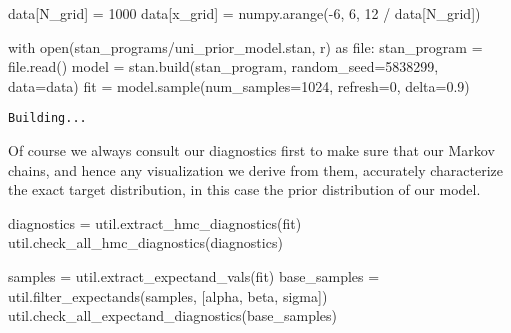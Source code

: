 \documentclass[
  letterpaper,
  DIV=11,
  numbers=noendperiod]{scrartcl}
\newenvironment{Shaded}{\begin{snugshade}}{\end{snugshade}}
\newcommand{\BuiltInTok}[1]{\textcolor[rgb]{0.00,0.23,0.31}{#1}}
\newcommand{\ControlFlowTok}[1]{\textcolor[rgb]{0.00,0.23,0.31}{#1}}
\newcommand{\DecValTok}[1]{\textcolor[rgb]{0.68,0.00,0.00}{#1}}
\newcommand{\FloatTok}[1]{\textcolor[rgb]{0.68,0.00,0.00}{#1}}
\newcommand{\ImportTok}[1]{\textcolor[rgb]{0.00,0.46,0.62}{#1}}
\newcommand{\NormalTok}[1]{\textcolor[rgb]{0.00,0.23,0.31}{#1}}
\newcommand{\OperatorTok}[1]{\textcolor[rgb]{0.37,0.37,0.37}{#1}}
\newcommand{\StringTok}[1]{\textcolor[rgb]{0.13,0.47,0.30}{#1}}
\begin{document}
\begin{Shaded}
\begin{Highlighting}[]
\NormalTok{data[}\StringTok{\textquotesingle{}N\_grid\textquotesingle{}}\NormalTok{] }\OperatorTok{=} \DecValTok{1000}
\NormalTok{data[}\StringTok{\textquotesingle{}x\_grid\textquotesingle{}}\NormalTok{] }\OperatorTok{=}\NormalTok{ numpy.arange(}\OperatorTok{{-}}\DecValTok{6}\NormalTok{, }\DecValTok{6}\NormalTok{, }\DecValTok{12} \OperatorTok{/}\NormalTok{ data[}\StringTok{\textquotesingle{}N\_grid\textquotesingle{}}\NormalTok{])}

\ControlFlowTok{with} \BuiltInTok{open}\NormalTok{(}\StringTok{\textquotesingle{}stan\_programs/uni\_prior\_model.stan\textquotesingle{}}\NormalTok{, }\StringTok{\textquotesingle{}r\textquotesingle{}}\NormalTok{) }\ImportTok{as} \BuiltInTok{file}\NormalTok{:}
\NormalTok{  stan\_program }\OperatorTok{=} \BuiltInTok{file}\NormalTok{.read()}
\NormalTok{model }\OperatorTok{=}\NormalTok{ stan.build(stan\_program, random\_seed}\OperatorTok{=}\DecValTok{5838299}\NormalTok{, data}\OperatorTok{=}\NormalTok{data)}
\NormalTok{fit }\OperatorTok{=}\NormalTok{ model.sample(num\_samples}\OperatorTok{=}\DecValTok{1024}\NormalTok{, refresh}\OperatorTok{=}\DecValTok{0}\NormalTok{, delta}\OperatorTok{=}\FloatTok{0.9}\NormalTok{)}
\end{Highlighting}
\end{Shaded}

\begin{verbatim}
Building...
\end{verbatim}

Of course we always consult our diagnostics first to make sure that our
Markov chains, and hence any visualization we derive from them,
accurately characterize the exact target distribution, in this case the
prior distribution of our model.

\begin{Shaded}
\begin{Highlighting}[]
\NormalTok{diagnostics }\OperatorTok{=}\NormalTok{ util.extract\_hmc\_diagnostics(fit)}
\NormalTok{util.check\_all\_hmc\_diagnostics(diagnostics)}

\NormalTok{samples }\OperatorTok{=}\NormalTok{ util.extract\_expectand\_vals(fit)}
\NormalTok{base\_samples }\OperatorTok{=}\NormalTok{ util.filter\_expectands(samples,}
\NormalTok{                                      [}\StringTok{\textquotesingle{}alpha\textquotesingle{}}\NormalTok{, }\StringTok{\textquotesingle{}beta\textquotesingle{}}\NormalTok{, }\StringTok{\textquotesingle{}sigma\textquotesingle{}}\NormalTok{])}
\NormalTok{util.check\_all\_expectand\_diagnostics(base\_samples)}
\end{Highlighting}
\end{Shaded}
\end{document}
